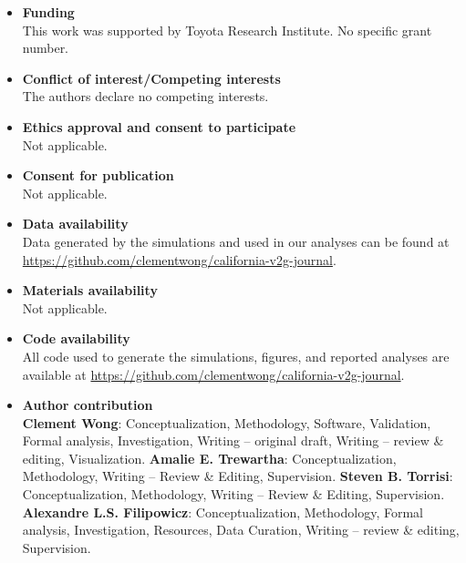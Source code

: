 \documentclass[pdflatex,sn-nature]{sn-jnl}%
\theoremstyle{thmstyleone}%
\theoremstyle{thmstyletwo}%
\theoremstyle{thmstylethree}%
\begin{document}
\begin{itemize}
    \item \textbf{Funding} \\
    This work was supported by Toyota Research Institute. No specific grant number.
    \item \textbf{Conflict of interest/Competing interests} \\
    The authors declare no competing interests.
    \item \textbf{Ethics approval and consent to participate} \\
    Not applicable.
    \item \textbf{Consent for publication}\\
    Not applicable.
    \item \textbf{Data availability}\\
    Data generated by the simulations and used in our analyses can be found at \url{https://github.com/clementwong/california-v2g-journal}. 
    \item \textbf{Materials availability} \\
    Not applicable.
    \item \textbf{Code availability} \\
    All code used to generate the simulations, figures, and reported analyses are available at \url{https://github.com/clementwong/california-v2g-journal}.
    \item \textbf{Author contribution} \\
    \textbf{Clement Wong}: Conceptualization, Methodology, Software, Validation, Formal analysis, Investigation, Writing – original draft, Writing – review \& editing, Visualization. 
    \textbf{Amalie E. Trewartha}: Conceptualization, Methodology, Writing – Review \& Editing, Supervision.
    \textbf{Steven B. Torrisi}: Conceptualization, Methodology, Writing – Review \& Editing, Supervision.
    \textbf{Alexandre L.S. Filipowicz}: Conceptualization, Methodology, Formal analysis, Investigation, Resources, Data Curation, Writing – review \& editing, Supervision.
\end{itemize}


\end{document}
